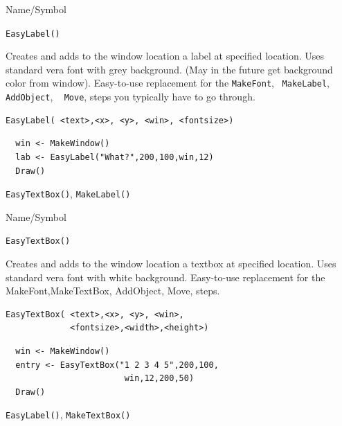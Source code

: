 \vfill
\newpage
{}
\vfill

\begin{desc}{Name/Symbol}
\item[Name/Symbol]	\verb+EasyLabel()+

\item[Description] Creates and adds to the window location a label
  at specified location. Uses standard vera font with grey background.
   (May in the future get background color from window).
  Easy-to-use replacement for the \verb+MakeFont+,  ~\verb+MakeLabel+,
 ~ \verb+AddObject+, ~ \verb+Move+, steps you typically have to go through.

\item[Usage]
\begin{verbatim}
EasyLabel( <text>,<x>, <y>, <win>, <fontsize>)
\end{verbatim}

\item[Example]	
\begin{verbatim}
  win <- MakeWindow()
  lab <- EasyLabel("What?",200,100,win,12)
  Draw()
\end{verbatim}
\item[See Also]	
\verb+EasyTextBox()+, \verb+MakeLabel()+
\end{desc}




\begin{desc}{Name/Symbol}
\item[Name/Symbol]	\verb+EasyTextBox()+

\item[Description] Creates and adds to the window location a textbox
  at specified location. Uses standard vera font with white background.
  Easy-to-use replacement for the MakeFont,MakeTextBox,
  AddObject, Move, steps.

\item[Usage]
\begin{verbatim}
EasyTextBox( <text>,<x>, <y>, <win>,
             <fontsize>,<width>,<height>)
\end{verbatim}

\item[Example]	
\begin{verbatim}
  win <- MakeWindow()
  entry <- EasyTextBox("1 2 3 4 5",200,100,
                        win,12,200,50)
  Draw()
\end{verbatim}
\item[See Also]	
\verb+EasyLabel()+, \verb+MakeTextBox()+
\end{desc}




